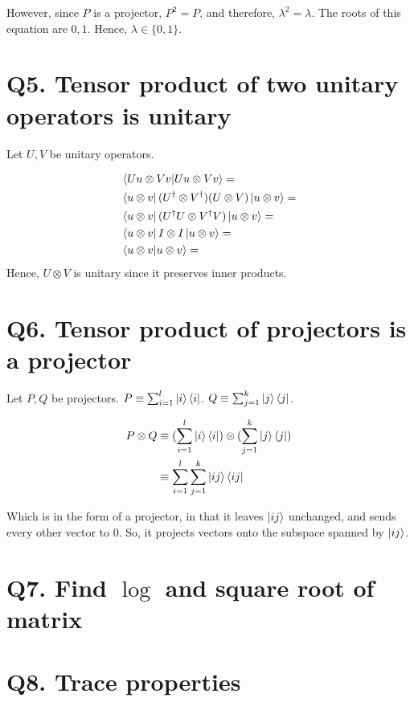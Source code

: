 \documentclass[11pt]{book}
\begin{document}
However, since $P$ is a projector, $P^2 = P$, and therefore, $\lambda^2 = \lambda$.
The roots of this equation are $0, 1$. Hence, $\lambda \in \{0, 1\}$.

\section{Q5. Tensor product of two unitary operators is unitary}
Let $U, V$ be unitary operators.

\begin{align*}
    &\bra{U u \otimes V v} \ket{U u \otimes V v} = \\
    &\bra{u \otimes v} (U^\dagger \otimes V^\dagger) (U \otimes V) \ket{u \otimes v} =  \\
    &\bra{u \otimes v} (U^\dagger U \otimes V^\dagger V) \ket{u \otimes v} = \\
    &\bra{u \otimes v} I \otimes I \ket{u \otimes v} = \\
    &\bra{u \otimes v} \ket{u \otimes v} = \\
\end{align*}
Hence, $U \otimes V$ is unitary since it preserves inner products.

\section{Q6. Tensor product of projectors is a projector}
Let $P, Q$ be projectors. $P \equiv \sum_{i=1}^l \ket{i}\bra{i}$.
$Q \equiv \sum_{j=1}^k \ket{j}\bra{j}$.


\begin{align*}
    P \otimes Q &\equiv (\sum_{i=1}^l \ket{i}\bra{i}) \otimes (\sum_{j=1}^k \ket{j}\bra{j}) \\
                &\equiv \sum_{i=1}^l \sum_{j=1}^k \ket{ij}\bra{ij} \\
\end{align*}

Which is in the form of a projector, in that it leaves $\ket{ij}$ unchanged,
and sends every other vector to $0$. So, it projects vectors onto the
subspace spanned by $\ket{ij}$.


\section{Q7. Find $\log$ and square root of matrix}
\section{Q8. Trace properties}
\end{document}
